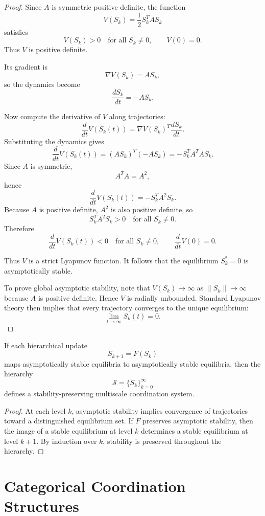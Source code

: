 \documentclass[12pt]{article}
\begin{document}
\begin{proof}
Since $A$ is symmetric positive definite, the function
\[
V(S_k) = \frac{1}{2} S_k^T A S_k
\]
satisfies
\[
V(S_k) > 0
\quad
\text{for all } S_k \neq 0,
\qquad
V(0)=0.
\]
Thus $V$ is positive definite.

Its gradient is
\[
\nabla V(S_k) = A S_k,
\]
so the dynamics become
\[
\frac{dS_k}{dt} = -A S_k.
\]

Now compute the derivative of $V$ along trajectories:
\[
\frac{d}{dt}V(S_k(t))
=
\nabla V(S_k)^T \frac{dS_k}{dt}.
\]
Substituting the dynamics gives
\[
\frac{d}{dt}V(S_k(t))
=
(AS_k)^T (-AS_k)
=
- S_k^T A^T A S_k.
\]
Since $A$ is symmetric,
\[
A^T A = A^2,
\]
hence
\[
\frac{d}{dt}V(S_k(t))
=
- S_k^T A^2 S_k.
\]
Because $A$ is positive definite, $A^2$ is also positive definite, so
\[
S_k^T A^2 S_k > 0
\quad
\text{for all } S_k \neq 0.
\]
Therefore
\[
\frac{d}{dt}V(S_k(t)) < 0
\quad
\text{for all } S_k \neq 0,
\qquad
\frac{d}{dt}V(0)=0.
\]

Thus $V$ is a strict Lyapunov function. It follows that the equilibrium $S_k^\ast=0$ is asymptotically stable.

To prove global asymptotic stability, note that $V(S_k)\to\infty$ as $\|S_k\|\to\infty$ because $A$ is positive definite. Hence $V$ is radially unbounded. Standard Lyapunov theory then implies that every trajectory converges to the unique equilibrium:
\[
\lim_{t\to\infty} S_k(t)=0.
\]
\end{proof}

\begin{corollary}
If each hierarchical update
\[
S_{k+1} = F(S_k)
\]
maps asymptotically stable equilibria to asymptotically stable equilibria, then the hierarchy
\[
\mathcal{S} = \{S_k\}_{k=0}^{\infty}
\]
defines a stability-preserving multiscale coordination system.
\end{corollary}

\begin{proof}
At each level $k$, asymptotic stability implies convergence of trajectories toward a distinguished equilibrium set. If $F$ preserves asymptotic stability, then the image of a stable equilibrium at level $k$ determines a stable equilibrium at level $k+1$. By induction over $k$, stability is preserved throughout the hierarchy.
\end{proof}
\section{Categorical Coordination Structures}
\end{document}
